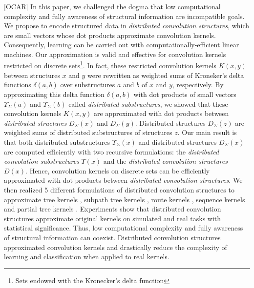 \documentclass[twoside,11pt]{article}
\def\df{\Upsilon}
\def\OCAR#1#2#3#4{[{\color{blue}O}{\color{brown}C}{\color{black}A}{\color{purple}R}] {\color{blue}#1} {\color{brown}#2} {\color{black}#3} {\color{purple}#4}}
\begin{document}
\OCAR{In this paper, we challenged the dogma that low computational complexity and fully awareness of structural information are incompatible goals.}{We propose to encode structured data in \emph{distributed convolution structures}, which are small vectors whose dot products approximate convolution kernels. Consequently, learning can be carried out with computationally-efficient linear machines.}{Our approximation is valid and effective for convolution kernels \cite{Haussler99convolutionkernels} restricted on discrete sets\footnote{Sets endowed with the Kronecker's delta function}. In fact, these restricted convolution kernels $K(x,y)$ between structures $x$ and $y$  were rewritten as weighted sums of Kroneker's delta functions $\delta(a,b)$ over substructures $a$ and $b$ of $x$ and $y$, respectively. 
By approximating this delta function $\delta(a, b)$  
with dot products of small vectors $\df_{\Sigma}(a)$ and $\df_{\Sigma}(b)$ called  \emph{distributed substructures}, we showed that these convolution kernels $K(x,y)$ are approximated with dot products between \emph{distributed structures} $D_{\Sigma}(x)$ and $D_{\Sigma}(y)$. Distributed structures $D_{\Sigma}(z)$ are weighted sums of distributed substructures of structures $z$. 
Our main result is that both distributed substructures $\df_{\Sigma}(x)$ and distributed structures $D_{\Sigma}(x)$ are computed efficiently with two recursive formulations: the \emph{distributed convolution substructures} $\df(x)$ and the \emph{distributed convolution structures} $D(x)$.  
Hence, convolution kernels on discrete sets can be efficiently approximated with dot products between \emph{distributed convolution structures}.
We then realized 5 different formulations of distributed convolution structures to approximate tree kernels \cite{Collins2002}, subpath tree kernels \cite{Kimura:2011:SKR:2017863.2017871}, route kernels \cite{Aiolli2009}, sequence kernels \cite{Lodhi:2002:TCU:944790.944799} and partial tree kernels \cite{Kashima:2002:KSD:645531.656021,Moschitti2006b}. Experiments show that distributed convolution structures approximate original kernels on simulated and real tasks with statistical significance.}{ Thus, low computational complexity and fully awareness of structural information can coexist. Distributed convolution structures approximated convolution kernels and drastically reduce the complexity of learning and classification when applied to real kernels.}
\end{document}
